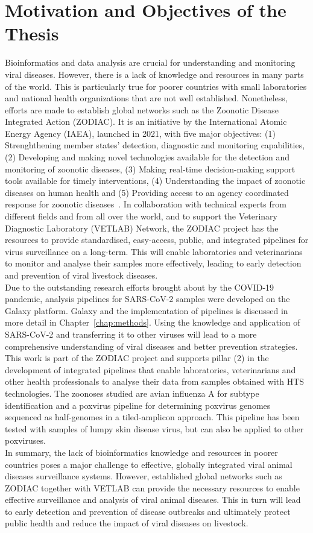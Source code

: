\section{Motivation and Objectives of the Thesis}
Bioinformatics and data analysis are crucial for understanding and monitoring viral diseases. However, there is a lack of knowledge and resources in many parts of the world. This is particularly true for poorer countries with small laboratories and national health organizations that are not well established. Nonetheless, efforts are made to establish global networks such as the Zoonotic Disease Integrated Action (ZODIAC). It is an initiative by the International Atomic Energy Agency (IAEA), launched in 2021, with five major objectives: (1) Strenghthening member states' detection, diagnostic and monitoring capabilities, (2) Developing and making novel technologies available for the detection and monitoring of zoonotic diseases, (3) Making real-time decision-making support tools available for timely interventions, (4) Understanding the impact of zoonotic diseases on human health and (5) Providing access to an agency coordinated response for zoonotic diseases~\cite{zodiac2021}. In collaboration with technical experts from different fields and from all over the world, and to support the Veterinary Diagnostic Laboratory (VETLAB) Network, the ZODIAC project has the resources to provide standardised, easy-access, public, and integrated pipelines for virus surveillance on a long-term. This will enable laboratories and veterinarians to monitor and analyse their samples more effectively, leading to early detection and prevention of viral livestock diseases.\\
Due to the outstanding research efforts brought about by the COVID-19 pandemic, analysis pipelines for SARS-CoV-2 samples were developed on the Galaxy platform. Galaxy and the implementation of pipelines is discussed in more detail in Chapter~\ref{chap:methods}. Using the knowledge and application of SARS-CoV-2 and transferring it to other viruses will lead to a more comprehensive understanding of viral diseases and better prevention strategies.\\
This work is part of the ZODIAC project and supports pillar (2) in the development of integrated pipelines that enable laboratories, veterinarians and other health professionals to analyse their data from samples obtained with HTS technologies. The zoonoses studied are avian influenza A for subtype identification and a poxvirus pipeline for determining poxvirus genomes sequenced as half-genomes in a tiled-amplicon approach. This pipeline has been tested with samples of lumpy skin disease virus, but can also be applied to other poxviruses.\\
In summary, the lack of bioinformatics knowledge and resources in poorer countries poses a major challenge to effective, globally integrated viral animal diseases surveillance systems. However, established global networks such as ZODIAC together with VETLAB can provide the necessary resources to enable effective surveillance and analysis of viral animal diseases. This in turn will lead to early detection and prevention of disease outbreaks and ultimately protect public health and reduce the impact of viral diseases on livestock.
